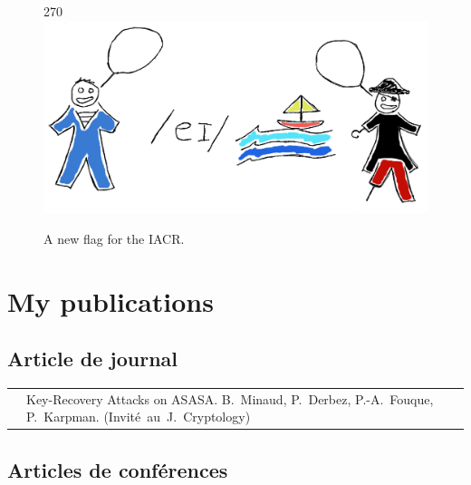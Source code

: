 \begin{figure}[!htb]
\begin{center}
\begin{turn}{270}
\includegraphics[scale=0.8]{iacr_coloured.png}
\end{turn}
\end{center}
\caption{A new flag for the IACR.\label{fig:iacr_flag}}
\end{figure}


\newcommand{\mybibtitle}[1]{\textsf{#1.}\hfil}
\newcommand{\mybibauth}[1]{#1.}
\newcommand{\mybibconf}[1]{\hspace*{\stretch{1}}\mbox{(#1)}}

\setcounter{section}{0}
\renewcommand\thesection{\Alph{section}}
\section[Mes publications]{My publications}

\subsection{Article de journal}

\noindent
\begin{tabularx}{\linewidth}{zX}
  \cite{asasajour} &
  \mybibtitle{Key-Recovery Attacks on ASASA}
  \mybibauth{B.~Minaud, P.~Derbez, P.-A.~Fouque, P.~Karpman}
  \mybibconf{Invité au J. Cryptology} \\
\end{tabularx}

\subsection{Articles de conférences}

